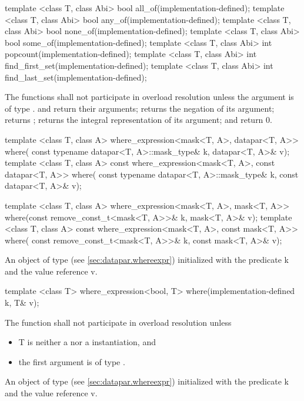 \begin{itemdecl}
template <class T, class Abi> bool  all_of(implementation-defined);
template <class T, class Abi> bool  any_of(implementation-defined);
template <class T, class Abi> bool none_of(implementation-defined);
template <class T, class Abi> bool some_of(implementation-defined);
template <class T, class Abi> int popcount(implementation-defined);
template <class T, class Abi> int find_first_set(implementation-defined);
template <class T, class Abi> int find_last_set(implementation-defined);
\end{itemdecl}
\begin{itemdescr}
  \pnum\remarks The functions shall not participate in overload resolution unless the argument is of type \bool.
  \pnum\returns {} and  return their arguments;  returns the negation of its argument;  returns \false;  returns the integral representation of its argument;  and  return 0.
\end{itemdescr}

\begin{itemdecl}
template <class T, class A>
where_expression<mask<T, A>, datapar<T, A>> where(
    const typename datapar<T, A>::mask_type& k, datapar<T, A>& v);
template <class T, class A>
const where_expression<mask<T, A>, const datapar<T, A>> where(
    const typename datapar<T, A>::mask_type& k, const datapar<T, A>& v);

template <class T, class A>
where_expression<mask<T, A>, mask<T, A>> where(const remove_const_t<mask<T, A>>& k,
                                               mask<T, A>& v);
template <class T, class A>
const where_expression<mask<T, A>, const mask<T, A>> where(
    const remove_const_t<mask<T, A>>& k, const mask<T, A>& v);
\end{itemdecl}
\begin{itemdescr}
  \pnum\returns An object of type  (see \ref{sec:datapar.whereexpr}) initialized with the predicate \code k and the value reference \code v.
\end{itemdescr}

\begin{itemdecl}
template <class T> where_expression<bool, T> where(implementation-defined k, T& v);
\end{itemdecl}
\begin{itemdescr}
  \pnum\remarks The function shall not participate in overload resolution unless
  \begin{itemize}
    \item \type T is neither a \datapar nor a \mask instantiation, and
    \item the first argument is of type \bool.
  \end{itemize}
  \pnum\returns An object of type  (see \ref{sec:datapar.whereexpr}) initialized with the predicate \code k and the value reference \code v.
\end{itemdescr}

